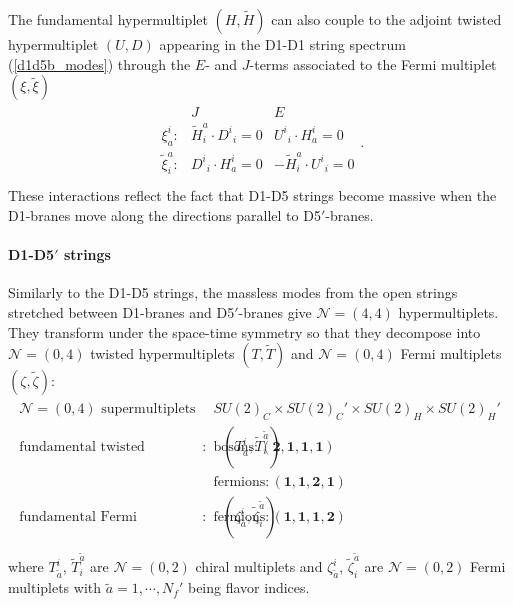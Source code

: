 \documentclass{article}
\numberwithin{equation}{section}
\begin{document}
The fundamental hypermultiplet $(H,\widetilde{H})$ can also couple to 
the adjoint twisted hypermultiplet $(U,D)$ appearing in the D1-D1 string spectrum (\ref{d1d5b_modes}) through 
the $E$- and $J$-terms associated to the Fermi multiplet $(\xi, \widetilde{\xi})$ 
\begin{align}
\label{je_d1d5}
\begin{array}{lcc}
&J&E \\
\xi^{i}_{a}:&
\widetilde{H}_{i}^{a}\cdot {D^{i}}_{i}=0&
{U^{i}}_{i}\cdot H^{i}_{a}=0\\
\widetilde{\xi}_{i}^{a}:&
 {D^{i}}_{i}\cdot H^{i}_{a}=0&
-\widetilde{H}_{i}^{a}\cdot {U^{i}}_{i}=0\\
\end{array}. 
\end{align}
These interactions reflect the fact that 
D1-D5 strings become massive when the D1-branes move along 
the directions parallel to D5$'$-branes. 













\paragraph{D1-D5$'$ strings}
Similarly to the D1-D5 strings, the massless modes from the open strings stretched between 
D1-branes and D5$'$-branes give $\mathcal{N}=(4,4)$ hypermultiplets. 
They transform under the space-time symmetry 
so that they decompose into $\mathcal{N}=(0,4)$ twisted hypermultiplets 
$(T,\widetilde{T})$ and $\mathcal{N}=(0,4)$ Fermi multiplets $(\zeta,\widetilde{\zeta})$: 
\begin{align}
\label{d1d5b_modes}
\begin{array}{c|c}
\textrm{$\mathcal{N}=(0,4)$ supermultiplets}& SU(2)_{C}\times SU(2)_{C}'\times SU(2)_{H}\times SU(2)_{H}' \\ \hline 
\textrm{fundamental twisted hypermultiplets}:\quad (T^{i}_{\tilde{a}}, \widetilde{T}_{i}^{\tilde{a}})
&\textrm{bosons}: (\bm{2}, \bm{1},\bm{1},\bm{1}) \\
&\textrm{fermions}: (\bm{1}, \bm{1},\bm{2},\bm{1}) \\ \hline 
\textrm{fundamental Fermi multiplets}:\quad (\zeta^{i}_{\tilde{a}}, \widetilde{\zeta}_{i}^{\tilde{a}})
&\textrm{fermions}: (\bm{1}, \bm{1},\bm{1},\bm{2}) \\
\end{array}
\end{align}
where $T^{i}_{\tilde{a}}$, $\widetilde{T}_{i}^{\tilde{a}}$ are $\mathcal{N}=(0,2)$ chiral multiplets 
and $\zeta^{i}_{\tilde{a}}$, $\widetilde{\zeta}_{i}^{\tilde{a}}$ are $\mathcal{N}=(0,2)$ Fermi multiplets 
with $\tilde{a}=1,\cdots, N_{f}'$ being flavor indices. 
\end{document}
